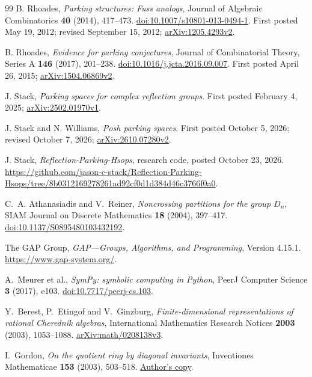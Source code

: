 \documentclass[11pt]{article}
\begin{document}
\begin{thebibliography}{99}
B. Rhoades,
\emph{Parking structures: Fuss analogs},
Journal of Algebraic Combinatorics \textbf{40} (2014), 417--473.
\href{https://doi.org/10.1007/s10801-013-0494-1}{doi:10.1007/s10801-013-0494-1}.
First posted May 19, 2012; revised September 15, 2012;
\href{https://arxiv.org/abs/1205.4293v2}{arXiv:1205.4293v2}.

B. Rhoades,
\emph{Evidence for parking conjectures},
Journal of Combinatorial Theory, Series A \textbf{146} (2017), 201--238.
\href{https://doi.org/10.1016/j.jcta.2016.09.007}{doi:10.1016/j.jcta.2016.09.007}.
First posted April 26, 2015;
\href{https://arxiv.org/abs/1504.06869v2}{arXiv:1504.06869v2}.

J. Stack,
\emph{Parking spaces for complex reflection groups}.
First posted February 4, 2025;
\href{https://arxiv.org/abs/2502.01970v1}{arXiv:2502.01970v1}.

J. Stack and N. Williams,
\emph{Posh parking spaces}.
First posted October 5, 2026; revised October 7, 2026;
\href{https://arxiv.org/abs/2610.07280v2}{arXiv:2610.07280v2}.

J. Stack,
\emph{Reflection-Parking-Hsops}, research code, posted October 23, 2026.
\url{https://github.com/jason-c-stack/Reflection-Parking-Hsops/tree/8b0312169278261ad92cf0d1d384d46c3766f0a0}.

C.~A. Athanasiadis and V.~Reiner,
\emph{Noncrossing partitions for the group $D_n$},
SIAM Journal on Discrete Mathematics \textbf{18} (2004), 397--417.
\href{https://doi.org/10.1137/S0895480103432192}{doi:10.1137/S0895480103432192}.

The GAP Group, \emph{GAP---Groups, Algorithms, and Programming},
Version 4.15.1. \url{https://www.gap-system.org/}.

A.~Meurer et al., \emph{SymPy: symbolic computing in Python},
PeerJ Computer Science \textbf{3} (2017), e103.
\href{https://doi.org/10.7717/peerj-cs.103}{doi:10.7717/peerj-cs.103}.

Y.~Berest, P.~Etingof and V.~Ginzburg,
\emph{Finite-dimensional representations of rational Cherednik algebras},
International Mathematics Research Notices \textbf{2003} (2003),
1053--1088.
\href{https://arxiv.org/abs/math/0208138v3}{arXiv:math/0208138v3}.

I.~Gordon, \emph{On the quotient ring by diagonal invariants},
Inventiones Mathematicae \textbf{153} (2003), 503--518.
\href{https://www.maths.ed.ac.uk/~igordon/pubs/diag3.pdf}{Author's copy}.


\end{thebibliography}
\end{document}

